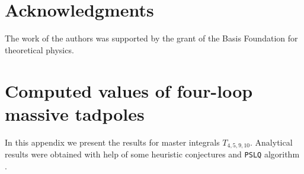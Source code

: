 \documentclass[sort&compress]{elsarticle}
\begin{document}
\section*{Acknowledgments}

The work of the authors was supported by the grant of the Basis Foundation for theoretical physics.

\appendix

\section{Computed values of four-loop massive tadpoles}

In this appendix we present the results for master integrals $T_{4,5,9,10}$.
Analytical results were obtained with help of some heuristic conjectures and \texttt{PSLQ} algorithm \cite{FergusonBailey:1992:PSLQ}.
\end{document}
